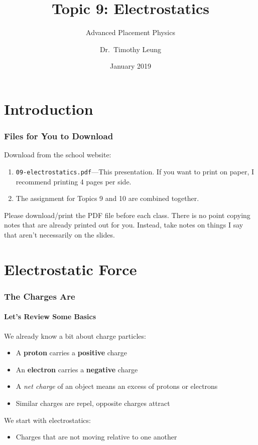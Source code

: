 \documentclass[12pt,aspectratio=169]{beamer}
\title{Topic 9: Electrostatics}
\subtitle{Advanced Placement Physics}
\author[TML]{Dr.\ Timothy Leung}
\institute{Olympiads School}
\date{January 2019}
\newcommand{\mb}[1]{\mathbf{#1}}
\begin{document}
\begin{frame}
  \maketitle
\end{frame}


\section[Intro]{Introduction}

\begin{frame}
  \frametitle{Files for You to Download}
  Download from the school website:
  \begin{enumerate}
  \item\texttt{09-electrostatics.pdf}---This presentation. If you want to print
    on paper, I recommend printing 4 pages per side.
  \item The assignment for Topics 9 and 10 are combined together.
  \end{enumerate}
  
  Please download/print the PDF file before each class. There is no point
  copying notes that are already printed out for you. Instead, take notes on
  things I say that aren't necessarily on the slides.
\end{frame}


\section[$\mb{F}_q$]{Electrostatic Force}

\begin{frame}
  \frametitle{The Charges Are}
  \framesubtitle{Let's Review Some Basics}
  We already know a bit about charge particles:
  \begin{itemize}
  \item A \textbf{proton} carries a \textbf{positive} charge
  \item An \textbf{electron} carries a \textbf{negative} charge
  \item A \emph{net charge} of an object means an excess of protons or electrons
  \item Similar charges are repel, opposite charges attract
  \end{itemize}

  \vspace{.2in}We start with electrostatics:
  \begin{itemize}
  \item Charges that are not moving relative to one another
  \end{itemize}
\end{frame}
\end{document}
